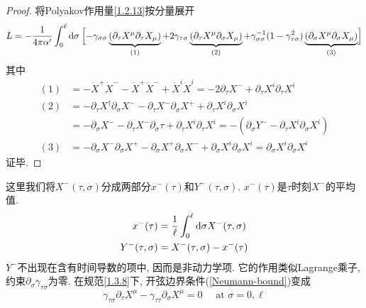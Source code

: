 \begin{tcolorbox}[breakable]
    \begin{proof}
        将Polyakov作用量\eqref{1.2.13}按分量展开
        \begin{align*}
        L=-\frac{1}{4 \pi \alpha^{\prime}} \int_{0}^{\ell} \mathrm{d}\sigma \:\Bigl[-\gamma_{\sigma \sigma}\underbrace{(\partial_\tau X^{\mu} \partial_\tau X_{\mu})}_{(1)} 
        +2 \gamma_{\tau \sigma}\underbrace{(\partial_{\tau} X^{\mu} \partial_{\sigma} X_{\mu})}_{(2)} 
        +\gamma_{\sigma \sigma}^{-1}(1-\gamma_{\tau \sigma}^{2}) \underbrace{(\partial_{\sigma} X^{\mu} \partial_{\sigma} X_{\mu})}_{(3)}\Bigr]
        \end{align*}
        其中
        \begin{align*}
        (1) &=-\dot{X}^{+} \dot{X}^{-}-\dot{X}^{+} \dot{X}^{-}+\dot{X}^{i} \dot{X}^{i} =-2 \partial_{\tau} X^{-}+\partial_{\tau} X^{i} \partial_{\tau} X^{i} \\
        (2) &=-\partial_{\tau} X^{\dagger} \partial_{\sigma} X^{-}-\partial_{\tau} X^{-} \partial_{\sigma} X^{+}+\partial_{\tau} X^{i} \partial_{\sigma} X^{i} \\
        &=-\partial_{\sigma} X^{-}-\partial_{\tau} X^{-} \partial_{\sigma} \tau+\partial_{\tau} X^{i} \partial_{\tau} X^{i} =-\left(\partial_{\sigma} Y^{-}-\partial_{\tau} X^{i} \partial_{\sigma} X^{i}\right) \\
        (3) &=-\partial_{\sigma} X^{-} \partial_{\sigma} X^{+}-\partial_{\sigma} X^{+} \partial_{\sigma} X^{-}+\partial_{\sigma} X^{i} \partial_{\sigma}X^{i} 
        =\partial_{\sigma} X^{i} \partial_{\sigma} X^{i}
        \end{align*}
        证毕.
        \end{proof}
\end{tcolorbox}
\noindent 这里我们将$X^-(\tau,\sigma)$分成两部分$x^-(\tau)$和$Y^-(\tau,\sigma)$. $x^-(\tau)$是$\tau$时刻$X^-$的平均值. 
\begin{subequations}
\begin{align}
x^{-}(\tau)&=\frac{1}{\ell} \int_{0}^{\ell} \mathrm{d} \sigma X^{-}(\tau, \sigma) \\
Y^{-}(\tau, \sigma)&=X^{-}(\tau, \sigma)-x^{-}(\tau)
\end{align}
\end{subequations}
$Y^-$不出现在含有时间导数的项中, 因而是非动力学项. 它的作用类似Lagrange乘子, 约束$\partial_\sigma\gamma_{\tau\sigma}$为零. 
在规范\eqref{1.3.8}下, 开弦边界条件(\ref{Neumann-bound})变成
\begin{equation}
\gamma_{\tau \sigma} \partial_{\tau} X^{\mu}-\gamma_{\tau \tau} \partial_{\sigma} X^{\mu}=0 \quad \text { at } \sigma=0, \ell
\end{equation}
